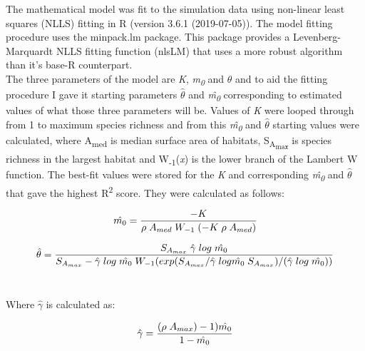 \noindent The mathematical model was fit to the simulation data using non-linear least squares (NLLS) fitting in R (version 3.6.1 (2019-07-05)). The model fitting procedure uses the minpack.lm package. This package provides a Levenberg-Marquardt NLLS fitting function (nlsLM) that uses a more robust algorithm than it's base-R counterpart. \\

{\texorpdfstring

\noindent \noindent  The three parameters of the model are \textit{K}, \textit{m\textsubscript{0}} and $\theta$ and to aid the fitting procedure I gave it starting parameters $\hat{\theta}$ and \textit{\^m\textsubscript{0}}} corresponding to estimated values of what those three parameters will be. Values of \textit{K} were looped through from 1 to maximum species richness and from this \textit{\^{m\textsubscript{0}}} and $\hat{\theta}$ starting values were calculated, where A\textsubscript{med} is median surface area of habitats, S\textsubscript{A\textsubscript{max}} is species richness in the largest habitat and W\textsubscript{-1}(\textit{x}) is the lower branch of the Lambert W function. The best-fit values were stored for the \textit{K} and corresponding \textit{\^{m\textsubscript{0}}} and $\hat{\theta}$ that gave the highest R\textsuperscript{2} score. They were calculated as follows:

\begin{equation}
\hat{m\textsubscript{0}}=\frac{-K}{{\rho}\;A_{med}\;W_{-1}\;(-K\;{\rho}\;A_{med})}
\end{equation}

\begin{equation}
\hat{\theta}=\frac{S_{A_{max}}\;\hat{\gamma}\;log\;\hat{m\textsubscript{0}}}{S_{A_{max}}-\hat{\gamma}\;log\;\hat{m\textsubscript{0}}\;W_{-1}(exp(S_{A_{max}}/\hat{\gamma}\;log\hat{m\textsubscript{0}}\;S_{A_{max}})/(\hat{\gamma}\;log\;\hat{m\textsubscript{0}}))}
\end{equation} \\

\begin{center}
Where $\hat{\gamma}$ is calculated as:\\
\end{center}

\begin{equation}
\hat{\gamma}=\frac{({\rho}\;A_{max})-1)\hat{m\textsubscript{0}}}{1-\hat{m\textsubscript{0}}}
\end{equation}\\

